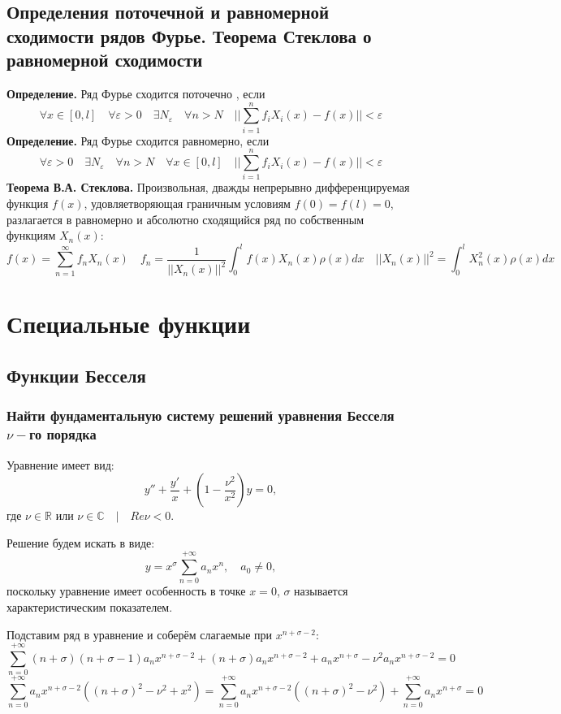\documentclass[12pt, a4paper]{report}
\begin{document}
\section{Определения поточечной и равномерной сходимости рядов Фурье. Теорема Стеклова о равномерной сходимости}
\textbf{Определение.} Ряд Фурье сходится поточечно , если
\[ \forall x \in [0, l] \quad \forall \varepsilon > 0 \quad \exists N_\varepsilon \quad \forall n > N \quad || \sum_{i = 1}^{n} f_i X_i (x) - f(x) || < \varepsilon\]
\textbf{Определение.} Ряд Фурье сходится равномерно, если
\[ \forall \varepsilon > 0 \quad \exists N_\varepsilon \quad \forall n > N \quad \forall x \in [0, l] \quad || \sum_{i = 1}^{n} f_i X_i (x) - f(x) || < \varepsilon\]
\textbf{Теорема В.А. Стеклова.} Произвольная, дважды непрерывно дифференцируемая функция $f(x)$, удовляетворяющая граничным условиям $f(0) = f(l) = 0$, разлагается в равномерно и абсолютно сходящийся ряд по собственным функциям $X_{n} (x)$:
\[ f(x) = \sum_{n = 1}^{\infty} f_n X_n (x) \quad f_n = \frac{1}{||X_n (x)||^2} \int_{0}^{l} f(x) X_n (x) \rho (x) dx \quad ||X_n (x) ||^2 = \int_{0}^{l}  X^2_n (x) \rho (x) dx \]

\chapter{Специальные функции}

\section{Функции Бесселя}
\subsection{Найти фундаментальную систему решений уравнения Бесселя $\nu-$го порядка}

Уравнение имеет вид:
\[ y'' + \frac{y'}{x} + (1 - \frac{\nu^2}{x^2}) y = 0, \]
где $\nu \in \mathbb{R}$ или $\nu \in \mathbb{C} \quad | \quad Re\nu < 0$.

Решение будем искать в виде:
\[ y = x^{\sigma} \sum_{n = 0}^{+\infty} a_{n} x^{n}, \quad a_{0} \neq 0, \]
поскольку уравнение имеет особенность в точке $x = 0$, $\sigma$ называется характеристическим показателем.

Подставим ряд в уравнение и соберём слагаемые при $x^{n + \sigma - 2}$:
\[ \sum_{n = 0}^{+\infty} (n + \sigma)(n + \sigma - 1)a_{n} x^{n + \sigma - 2} + (n+ \sigma)a_{n} x^{n + \sigma - 2} + a_{n} x^{n + \sigma} - \nu^2 a_{n} x^{n + \sigma - 2} = 0 \]
\[ \sum_{n = 0}^{+\infty} a_{n} x^{n + \sigma - 2} ((n + \sigma)^2 - \nu^2 + x^2) = \sum_{n = 0}^{+\infty} a_{n} x^{n + \sigma - 2} ((n + \sigma)^2 - \nu^2) + \sum_{n = 0}^{+\infty} a_{n} x^{n + \sigma} = 0\]
\end{document}
